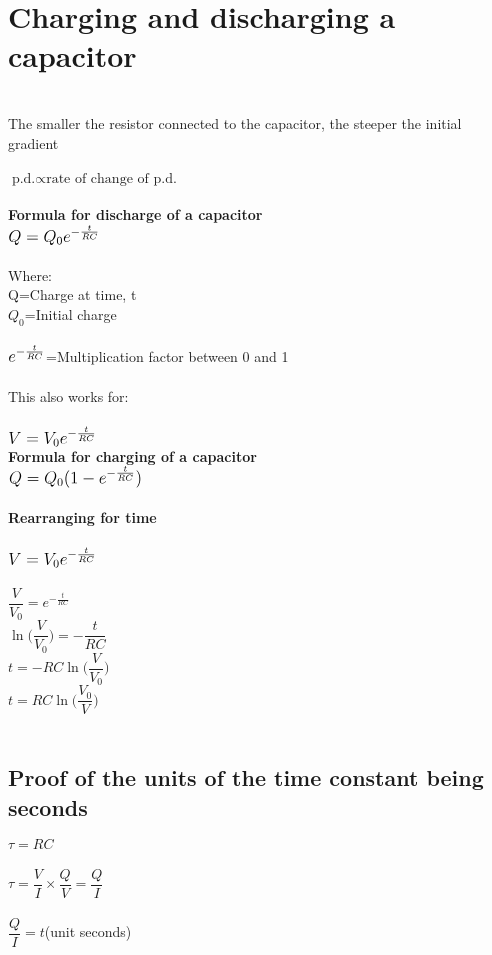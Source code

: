 \documentclass{article}[18pt]
\begin{document}
\section{Charging and discharging a capacitor}
\\
The smaller the resistor connected to the capacitor, the steeper the initial gradient\\
\\
$\text{p.d.}\propto \text{rate of change of p.d.}$\\
\\
\textbf{Formula for discharge of a capacitor}\\
$\mathlarger{\mathlarger{Q=Q_0e^{-\frac{t}{RC}}}}$\\
\\
Where:\\
Q=Charge at time, t\\
$Q_0$=Initial charge\\
\\
$\mathlarger{\mathlarger{e^{-\frac{t}{RC}}}}$=Multiplication factor between 0 and 1\\
\\
This also works for:\\
\\
$\mathlarger{\mathlarger{V=V_0e^{-\frac{t}{RC}}}}$\\
\textbf{Formula for charging of a capacitor}\\
$\mathlarger{\mathlarger{Q=Q_0(1-e^{-\frac{t}{RC}})}}$\\
\\
\textbf{Rearranging for time}\\
\\
$\mathlarger{\mathlarger{V=V_0e^{-\frac{t}{RC}}}}$\\
\\
$\dfrac{V}{V_0}=e^{-\frac{t}{RC}}$\\
$\ln\Big(\dfrac{V}{V_0}\Big)=-\dfrac{t}{RC}$\\
$t=-RC\ln\Big(\dfrac{V}{V_0}\Big)$\\
$t=RC\ln\Big(\dfrac{V_0}{V}\Big)$\\
\\
\subsection{Proof of the units of the time constant being seconds}
$\tau=RC$\\\\
$\tau=\dfrac{V}{I}\times\dfrac{Q}{V}=\dfrac{Q}{I}$\\
\\
$\dfrac{Q}{I}=t$(unit seconds)
\end{document}
